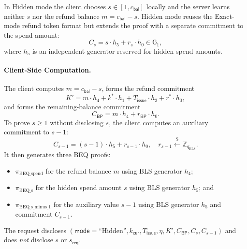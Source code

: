 \documentclass[11pt]{article}
\theoremstyle{definitionstyle}
\theoremstyle{plain}
\begin{document}
In Hidden mode the client chooses $s \in [1,c_{\mathsf{bal}}]$ locally and the server learns neither $s$ nor the refund balance $m = c_{\mathsf{bal}} - s$. Hidden mode reuses the Exact-mode refund token format but extends the proof with a separate commitment to the spend amount:
\[
C_s = s \cdot h_5 + r_s \cdot h_0 \in \mathbb{G}_1,
\]
where $h_5$ is an independent generator reserved for hidden spend amounts.

\paragraph{Client-Side Computation.}
The client computes $m = c_{\mathsf{bal}} - s$, forms the refund commitment
\[
K' = m \cdot h_4 + k^* \cdot h_1 + T_{\mathsf{issue}} \cdot h_2 + r^* \cdot h_0,
\]
and forms the remaining-balance commitment
\[
C_{\mathsf{BP}} = m \cdot h_4 + r_{\mathsf{BP}} \cdot h_0.
\]
To prove $s \ge 1$ without disclosing $s$, the client computes an auxiliary commitment to $s - 1$:
\[
C_{s-1} = (s - 1) \cdot h_5 + r_{s-1} \cdot h_0, \quad r_{s-1} \xleftarrow{\$} \mathbb{Z}_{q_{\text{BLS}}}.
\]
It then generates three BEQ proofs:
\begin{itemize}[leftmargin=*]
\item $\pi_{\text{BEQ\_spend}}$ for the refund balance $m$ using BLS generator $h_4$;
\item $\pi_{\text{BEQ\_s}}$ for the hidden spend amount $s$ using BLS generator $h_5$; and
\item $\pi_{\text{BEQ\_s\_minus\_1}}$ for the auxiliary value $s-1$ using BLS generator $h_5$ and commitment $C_{s-1}$.
\end{itemize}
The request discloses $(\mathsf{mode}=\text{``Hidden''}, k_{\mathsf{cur}}, T_{\mathsf{issue}}, \eta, K', C_{\mathsf{BP}}, C_s, C_{s-1})$ and does \emph{not} disclose $s$ or $s_{\mathsf{req}}$.
\end{document}
